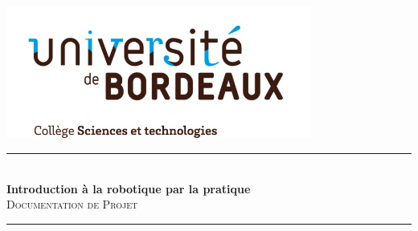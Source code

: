 \documentclass[11pt, a4paper]{article}
\begin{document}
\begin{titlepage}

\newcommand{\HRule}{\rule{\linewidth}{0.5mm}} %
\center %


\begin{center}
\begin{minipage}{0.4\textwidth}
\end{minipage}\\[1cm]
  \includegraphics[width=10cm]{logo.jpg}\\[1cm]
\end{center}


\HRule \\[0.4cm] %
{ \huge \bfseries Introduction à la robotique par la pratique}\\[0.5cm] %
\textsc{\Large Documentation de Projet}\\[0.5cm] 
\HRule \\[1.5cm]  %
 


\end{titlepage}
\end{document}
